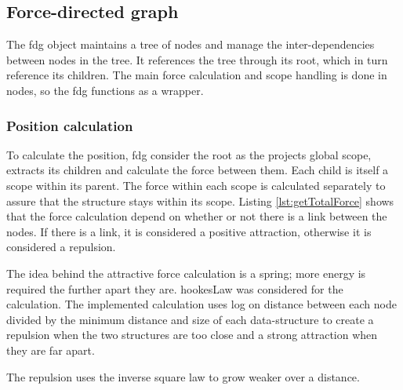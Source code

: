 \subsection{Force-directed graph}
The \gls{fdg} object maintains a tree of nodes and manage the inter-dependencies between nodes in the tree. It references the tree through its root, which in turn reference its children. The main force calculation and scope handling is done in nodes, so the \gls{fdg} functions as a wrapper.

\subsubsection{Position calculation}



To calculate the position, \gls{fdg} consider the root as the projects global scope, extracts its children and calculate the force between them. Each child is itself a scope within its parent. The force within each scope is calculated separately to assure that the structure stays within its scope. Listing \ref{lst:getTotalForce} shows that the force calculation depend on whether or not there is a link between the nodes. If there is a link, it is considered a positive attraction, otherwise it is considered a repulsion. 

The idea behind the attractive force calculation is a spring; more energy is required the further apart they are. \gls{hookesLaw} was considered for the calculation. The implemented calculation uses log on distance between each node divided by the minimum distance and size of each data-structure to create a repulsion when the two structures are too close and a strong attraction when they are far apart. 

The repulsion uses the inverse square law to grow weaker over a distance.

